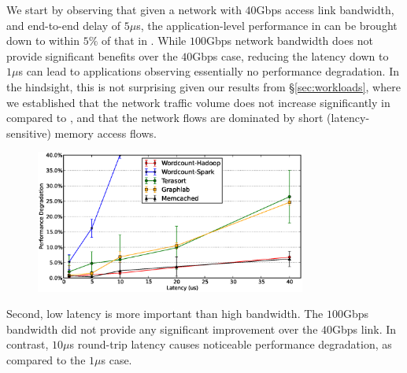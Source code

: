 
We start by observing that given a network with $40$Gbps access link bandwidth, and end-to-end delay of $5\mu$s, the application-level performance in \dis can be brought down to within $5\%$ of that in \pdis. While $100$Gbps network bandwidth does not provide significant benefits over the $40$Gbps case, reducing the latency down to $1\mu$s can lead to applications observing essentially no performance degradation. In the hindsight, this is not surprising given our results from \S\ref{sec:workloads}, where we established that the network traffic volume does not increase significantly in \dis compared to \pdis, and that the network flows are dominated by short (latency-sensitive) memory access flows. 


%
\begin{figure}
  \centering
    \includegraphics[width = 3.5in]{img/fix_bw_vary_latency.eps} 
  \caption{\small{}}
  \label{fig:impl}
\end{figure}
%
Second, low latency is more important than high bandwidth. The $100$Gbps bandwidth did not provide any significant improvement over the $40$Gbps link. In contrast, $10\mu$s round-trip latency causes noticeable performance degradation, as compared to the $1\mu$s case.

